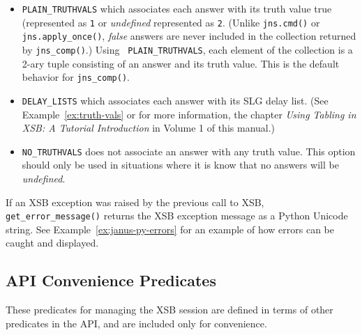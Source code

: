 \begin{description}
\begin{itemize}
      \bi

      \item {\tt PLAIN\_TRUTHVALS} which associates each answer with
        its truth value true (represented as {\tt 1} or {\em
          undefined} represented as {\tt 2}. (Unlike {\tt jns.cmd()}
        or {\tt jns.apply\_once()}, {\em false} answers are never included in
        the collection returned by {\tt jns\_comp()}.)  Using {\tt
          PLAIN\_TRUTHVALS}, each element of the collection is a 2-ary
        tuple consisting of an answer and its truth value.  This is
        the default behavior for {\tt jns\_comp()}.
      
      \item {\tt DELAY\_LISTS} which associates each answer with its
        SLG delay list. (See Example~\ref{ex:truth-vals} or for more
        information, the chapter {\em Using Tabling in XSB: A Tutorial
          Introduction} in Volume 1 of this manual.)

      \item {\tt NO\_TRUTHVALS} does not associate an answer with any
        truth value.  This option should only be used in situations
        where it is know that no answers will be {\em undefined}.
        \ei
  \end{itemize}

  If an XSB exception was raised by the previous call to XSB, {\tt
    get\_error\_message()} returns the XSB exception message as a
  Python Unicode string.  See Example~\ref{ex:janus-py-errors} for an
  example of how errors can be caught and displayed.
  
\end{description}

\subsection{\januspy{} API Convenience Predicates}

These predicates for managing the XSB session are defined in terms of
other predicates in the \januspy{} API, and are included only for
convenience.

